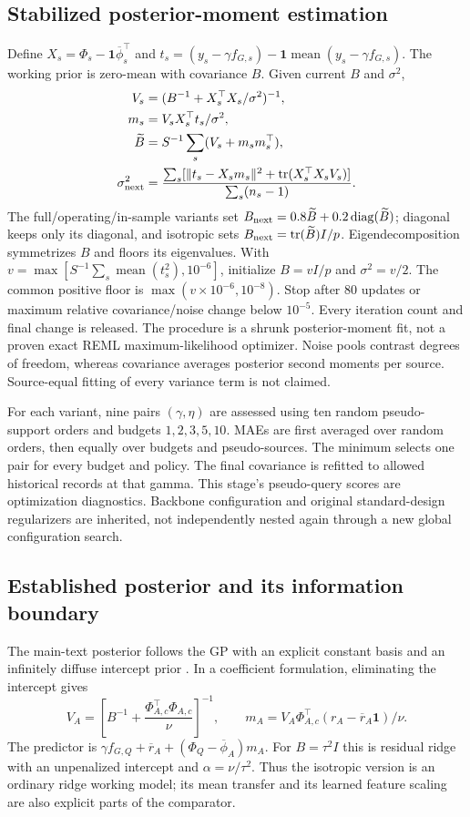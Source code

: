 \subsection{Stabilized posterior-moment estimation}
Define $X_s=\Phi_s-\mathbf1\overline\phi_s^\top$ and
$t_s=(y_s-\gamma f_{G,s})-\mathbf1\operatorname{mean}(y_s-\gamma f_{G,s})$.
The working prior is zero-mean with covariance $B$. Given current $B$ and $\sigma^2$,
\begin{align}
V_s&=(B^{-1}+X_s^\top X_s/\sigma^2)^{-1},\\
m_s&=V_sX_s^\top t_s/\sigma^2,\\
\widetilde B&=S^{-1}\sum_s(V_s+m_sm_s^\top),\\
\sigma_{\rm next}^2&=\frac{\sum_s[\|t_s-X_sm_s\|^2+\operatorname{tr}(X_s^\top X_sV_s)]}{\sum_s(n_s-1)}.
\end{align}
The full/operating/in-sample variants set $B_{\rm next}=0.8\widetilde B+0.2\operatorname{diag}(\widetilde B)$; diagonal keeps only its diagonal, and isotropic sets $B_{\rm next}=\operatorname{tr}(\widetilde B)I/p$. Eigendecomposition symmetrizes $B$ and floors its eigenvalues. With $v=\max[S^{-1}\sum_s\operatorname{mean}(t_s^2),10^{-6}]$, initialize $B=vI/p$ and $\sigma^2=v/2$. The common positive floor is $\max(v\times10^{-6},10^{-8})$. Stop after 80 updates or maximum relative covariance/noise change below $10^{-5}$. Every iteration count and final change is released. The procedure is a shrunk posterior-moment fit, not a proven exact REML maximum-likelihood optimizer. Noise pools contrast degrees of freedom, whereas covariance averages posterior second moments per source. Source-equal fitting of every variance term is not claimed.

For each variant, nine pairs $(\gamma,\eta)$ are assessed using ten random pseudo-support orders and budgets $1,2,3,5,10$. MAEs are first averaged over random orders, then equally over budgets and pseudo-sources. The minimum selects one pair for every budget and policy. The final covariance is refitted to allowed historical records at that gamma. This stage's pseudo-query scores are optimization diagnostics. Backbone configuration and original standard-design regularizers are inherited, not independently nested again through a new global configuration search.

\subsection{Established posterior and its information boundary}
The main-text posterior follows the GP with an explicit constant basis and an infinitely diffuse intercept prior \cite{gpml}. In a coefficient formulation, eliminating the intercept gives
\[
V_A=\left[B^{-1}+\frac{\Phi_{A,c}^\top\Phi_{A,c}}{\nu}\right]^{-1},\qquad
m_A=V_A\Phi_{A,c}^\top(r_A-\overline r_A\mathbf1)/\nu.
\]
The predictor is $\gamma f_{G,Q}+\overline r_A+(\Phi_Q-\overline\phi_A)m_A$. For $B=\tau^2I$ this is residual ridge with an unpenalized intercept and $\alpha=\nu/\tau^2$. Thus the isotropic version is an ordinary ridge working model; its mean transfer and its learned feature scaling are also explicit parts of the comparator.

